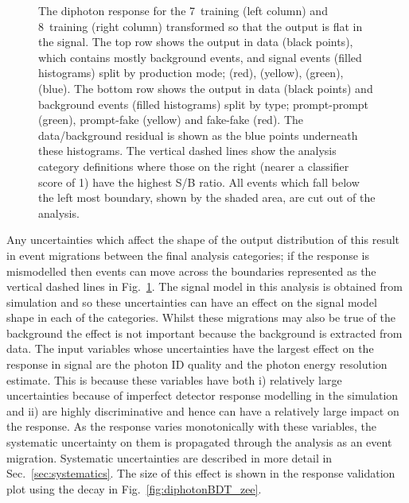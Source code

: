 \begin{figure}
  \caption[The diphoton \acs{BDT} response]{The diphoton \BDT response for the 7~\TeV training (left column) and 8~\TeV training (right column) transformed so that the output is flat in the signal. The top row shows the output in data (black points), which contains mostly background events, and signal \MC events (filled histograms) split by production mode; \ggH (red), \VBF (yellow), \VH (green), \ttH (blue). The bottom row shows the output in data (black points) and background \MC events (filled histograms) split by type; prompt-prompt (green), prompt-fake (yellow) and fake-fake (red). The data/background residual is shown as the blue points underneath these histograms. The vertical dashed lines show the analysis category definitions where those on the right (nearer a classifier score of 1) have the highest S/B ratio. All events which fall below the left most boundary, shown by the shaded area, are cut out of the analysis.}
  \label{fig:dipho_bdt}
\end{figure}

Any uncertainties which affect the shape of the output distribution of this \BDT result in event migrations between the final analysis categories; if the \BDT response is mismodelled then events can move across the boundaries represented as the vertical dashed lines in Fig.~\ref{fig:dipho_bdt}. The signal model in this analysis is obtained from \MC simulation and so these uncertainties can have an effect on the signal model shape in each of the categories. Whilst these migrations may also be true of the background the effect is not important because the background is extracted from data. The input variables whose uncertainties have the largest effect on the \BDT response in signal are the photon ID quality and the photon energy resolution estimate. This is because these variables have both i) relatively large uncertainties because of imperfect detector response modelling in the simulation and ii) are highly discriminative and hence can have a relatively large impact on the \BDT response. As the \BDT response varies monotonically with these variables, the systematic uncertainty on them is propagated through the analysis as an event migration. Systematic uncertainties are described in more detail in Sec.~\ref{sec:systematics}. The size of this effect is shown in the \BDT response validation plot using the \Zee decay in Fig.~\ref{fig:diphotonBDT_zee}.

